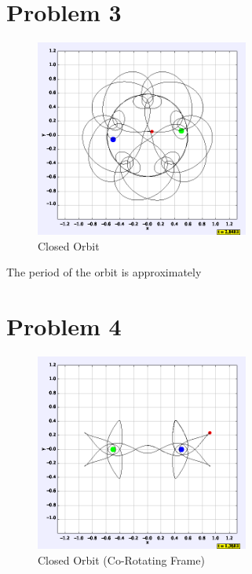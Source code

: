 \documentclass[pra,superscriptaddress,reprint,showpacs]{revtex4-1}
\begin{document}
\section{Problem 3}

\begin{figure}[H]
    \centering 
    \caption{Closed Orbit}
    \includegraphics[width=7cm]{3.png}
\end{figure}

The period of the orbit is approximately 

\section{Problem 4}

\begin{figure}[h!]
    \centering 
    \caption{Closed Orbit (Co-Rotating Frame)}
    \includegraphics[width=7cm]{corot.png}
\end{figure}
\end{document}
